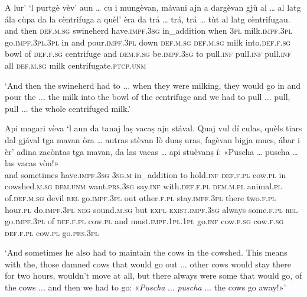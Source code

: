 \begin{linenumbers}
	\gll A lur’ `l purtgè vèv’ aun … cu i mungèvan, mávani ajn a dargèvan gjù al … al latg ála cùpa da la cèntrifuga a quèl’ èra da trá … trá, trá … tùt al latg cèntrifugau.\\
	and then \textsc{def.m.sg} swineherd have.\textsc{impf.3sg} in\_addition {} when \textsc{3pl} milk.\textsc{impf.3pl} go.\textsc{impf.3pl.3pl} in and pour.\textsc{impf.3pl} down \textsc{def.m.sg} {} \textsc{def.m.sg} milk into.\textsc{def.f.sg} bowl of \textsc{def.f.sg} centrifuge and \textsc{dem.f.sg} be.\textsc{impf.3sg} to pull.\textsc{inf} {} pull.\textsc{inf} pull.\textsc{inf} {} all \textsc{def.m.sg} milk centrifugate.\textsc{ptcp.unm}    \\
\end{linenumbers}
\medskip
\glt `And then the swineherd had to ... when they were milking, they would go in and pour the ... the milk into the bowl of the centrifuge and we had to pull ... pull, pull ... the whole centrifuged milk.'
\medskip

\begin{linenumbers}
	\gll Api magari vèva `l aun da tanaj laṣ vacaṣ ajn stával.\footnotemark{} Quaj vul dí culas,\footnotemark{} quèls tiars dal gjával tga mavan òra … autras stèvan lò duaṣ uras, fagèvan bigja mucs, ábar i èr’ adina zacòntas tga mavan, da las vacas …  api stuèvanṣ í: «Puscha … puscha\footnotemark{} … las vacas vòn!» \\
and sometimes have.\textsc{impf.3sg} \textsc{3sg.m} in\_addition to hold.\textsc{inf} \textsc{def.f.pl} cow.\textsc{pl} in cowshed.\textsc{m.sg} \textsc{dem.unm} want.\textsc{prs.3sg} say.\textsc{inf} with.\textsc{def.f.pl} \textsc{dem.m.pl} animal.\textsc{pl} of.\textsc{def.m.sg} devil \textsc{rel} go.\textsc{impf.3pl} out {} other.\textsc{f.pl} stay.\textsc{impf.3pl} there two.\textsc{f.pl} hour.\textsc{pl} do.\textsc{impf.3pl} \textsc{neg} sound.\textsc{m.sg} but \textsc{expl} \textsc{exist.impf.3sg} always some.\textsc{f.pl} \textsc{rel} go.\textsc{impf.3pl} of \textsc{def.f.pl} cow.\textsc{pl} {} and must.\textsc{impf.1pl.1pl} go.\textsc{inf} cow.\textsc{f.sg} {} cow.\textsc{f.sg} {} \textsc{def.f.pl} cow.\textsc{pl} go.\textsc{prs.3pl}\\
\end{linenumbers}
\medskip
\glt `And sometimes he also had to maintain the cows in the cowshed. This means with the, those damned cows that would go out ... other cows would stay there for two hours, wouldn't move at all, but there always were some that would go, of the cows ... and then we had to go: «\textit{Puscha} ... \textit{puscha} ... the cows go away!»'
 
\medskip

